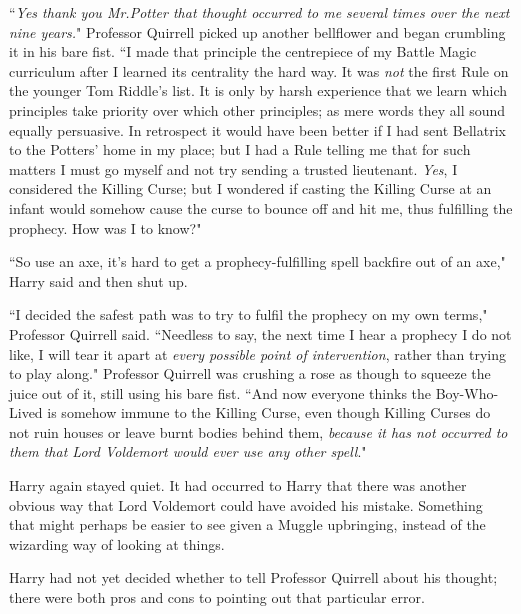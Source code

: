 ``\emph{Yes thank you Mr.\?Potter that thought occurred to me several times over the next nine years.}" Professor Quirrell picked up another bellflower and began crumbling it in his bare fist. ``I made that principle the centrepiece of my Battle Magic curriculum after I learned its centrality the hard way. It was \emph{not} the first Rule on the younger Tom Riddle's list. It is only by harsh experience that we learn which principles take priority over which other principles; as mere words they all sound equally persuasive. In retrospect it would have been better if I had sent Bellatrix to the Potters' home in my place; but I had a Rule telling me that for such matters I must go myself and not try sending a trusted lieutenant. \emph{Yes}, I considered the Killing Curse; but I wondered if casting the Killing Curse at an infant would somehow cause the curse to bounce off and hit me, thus fulfilling the prophecy. How was I to know?"

``So use an axe, it's hard to get a prophecy-fulfilling spell backfire out of an axe," Harry said and then shut up.

``I decided the safest path was to try to fulfil the prophecy on my own terms," Professor Quirrell said. ``Needless to say, the next time I hear a prophecy I do not like, I will tear it apart at \emph{every possible point of intervention}, rather than trying to play along." Professor Quirrell was crushing a rose as though to squeeze the juice out of it, still using his bare fist. ``And now everyone thinks the Boy-Who-Lived is somehow immune to the Killing Curse, even though Killing Curses do not ruin houses or leave burnt bodies behind them, \emph{because it has not occurred to them that Lord Voldemort would ever use any other spell}."

Harry again stayed quiet. It had occurred to Harry that there was another obvious way that Lord Voldemort could have avoided his mistake. Something that might perhaps be easier to see given a Muggle upbringing, instead of the wizarding way of looking at things.

Harry had not yet decided whether to tell Professor Quirrell about his thought; there were both pros and cons to pointing out that particular error.

